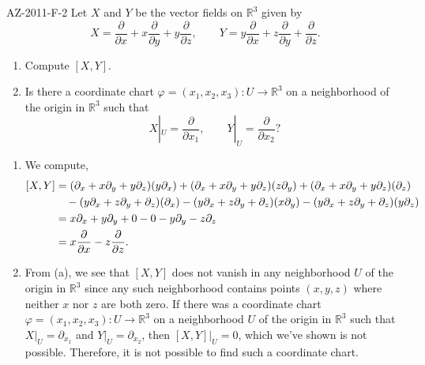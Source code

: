 \documentclass{article}
\begin{document}
	\begin{prb}{AZ-2011-F-2}
		Let $X$ and $Y$ be the vector fields on $\mathbb{R}^{3}$ given by 
		\begin{equation*}
			X = \frac{\partial}{\partial x} + x\frac{\partial}{\partial y} + y\frac{\partial}{\partial z}, \qquad Y = y\frac{\partial}{\partial x} + z\frac{\partial}{\partial y} + \frac{\partial}{\partial z}. 
		\end{equation*}
		\begin{enumerate}[itemsep =-2pt,label = (\alph{*})]
			\item Compute $[X, Y]$. 
			\item Is there a coordinate chart $\varphi = (x_{1}, x_{2}, x_{3}): U \to \mathbb{R}^{3}$ on a neighborhood of the origin in $\mathbb{R}^{3}$ such that 
			\begin{equation*}
				X|_{U} = \frac{\partial}{\partial x_{1}}, \qquad Y|_{U} = \frac{\partial}{\partial x_{2}}? 
			\end{equation*} 
		\end{enumerate}
	\end{prb}
	\begin{enumerate}[itemsep =-2pt,label = (\alph{*})]
		\item We compute, 
		\begin{align*}
			\begin{split}
				[X, Y] &= (\partial_{x} + x\partial_{y} + y\partial_{z})(y\partial_{x}) + (\partial_{x} + x\partial_{y} + y\partial_{z})(z\partial_{y}) + (\partial_{x} + x\partial_{y} + y\partial_{z})(\partial_{z}) \\
				&\textcolor{white}{=} \hspace{2pt} - (y\partial_{x} + z\partial_{y} + \partial_{z})(\partial_{x}) - (y\partial_{x} + z\partial_{y} + \partial_{z})(x\partial_{y}) - (y\partial_{x} + z\partial_{y} + \partial_{z})(y\partial_{z}) \\
				&= x\partial_{x} + y\partial_{y} + 0 - 0 -y\partial_{y} - z\partial_{z} \\
				&= x\frac{\partial}{\partial x} - z\frac{\partial}{\partial z}. 
			\end{split} 
		\end{align*}
		\item From (a), we see that $[X, Y]$ does not vanish in any neighborhood $U$ of the origin in $\mathbb{R}^{3}$ since any such neighborhood contains points $(x, y, z)$ where neither $x$ nor $z$ are both zero. If there was a coordinate chart $\varphi = (x_{1}, x_{2}, x_{3}): U \to \mathbb{R}^{3}$ on a neighborhood $U$ of the origin in $\mathbb{R}^{3}$ such that $X|_{U} = \partial_{x_{1}}$ and $Y|_{U} = \partial_{x_{2}}$, then $[X, Y]|_{U} = 0$, which we've shown is not possible. Therefore, it is not possible to find such a coordinate chart. 
	\end{enumerate}
	
\end{document}
